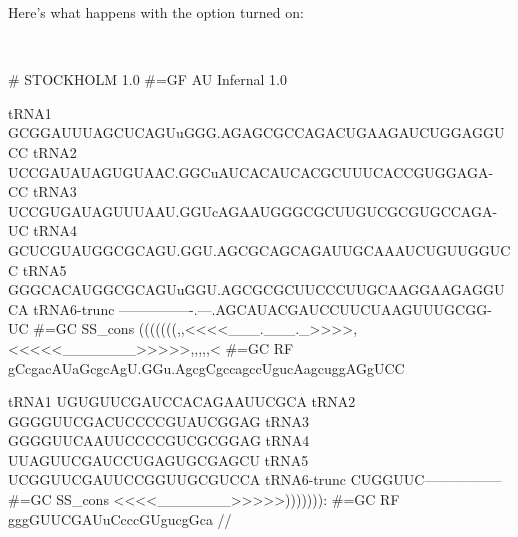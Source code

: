 Here's what happens with the  option turned on:

\\

{\samepage
\begin{sreoutput}
# STOCKHOLM 1.0
#=GF AU Infernal 1.0

tRNA1        GCGGAUUUAGCUCAGUuGGG.AGAGCGCCAGACUGAAGAUCUGGAGGUCC
tRNA2        UCCGAUAUAGUGUAAC.GGCuAUCACAUCACGCUUUCACCGUGGAGA-CC
tRNA3        UCCGUGAUAGUUUAAU.GGUcAGAAUGGGCGCUUGUCGCGUGCCAGA-UC
tRNA4        GCUCGUAUGGCGCAGU.GGU.AGCGCAGCAGAUUGCAAAUCUGUUGGUCC
tRNA5        GGGCACAUGGCGCAGUuGGU.AGCGCGCUUCCCUUGCAAGGAAGAGGUCA
tRNA6-trunc  ----------------.---.AGCAUACGAUCCUUCUAAGUUUGCGG-UC
#=GC SS_cons (((((((,,<<<<___.___._>>>>,<<<<<_______>>>>>,,,,,<
#=GC RF      gCcgacAUaGcgcAgU.GGu.AgcgCgccagccUgucAagcuggAGgUCC

tRNA1        UGUGUUCGAUCCACAGAAUUCGCA
tRNA2        GGGGUUCGACUCCCCGUAUCGGAG
tRNA3        GGGGUUCAAUUCCCCGUCGCGGAG
tRNA4        UUAGUUCGAUCCUGAGUGCGAGCU
tRNA5        UCGGUUCGAUUCCGGUUGCGUCCA
tRNA6-trunc  CUGGUUC-----------------
#=GC SS_cons <<<<_______>>>>>))))))):
#=GC RF      gggGUUCGAUuCcccGUgucgGca
//
\end{sreoutput}
}


